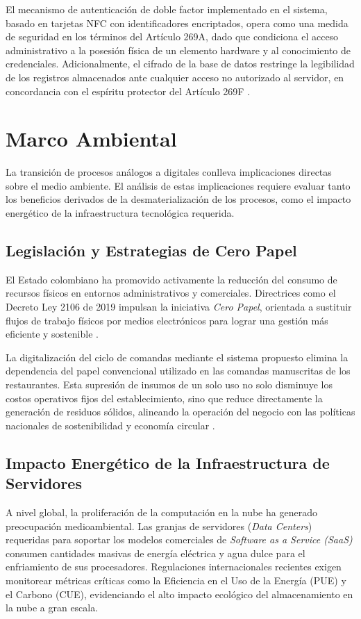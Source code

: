 El mecanismo de autenticación de doble factor implementado en el sistema,
basado en tarjetas NFC con identificadores encriptados, opera como una
medida de seguridad en los términos del Artículo 269A, dado que condiciona
el acceso administrativo a la posesión física de un elemento hardware y al
conocimiento de credenciales. Adicionalmente, el cifrado de la base de datos
restringe la legibilidad de los registros almacenados ante cualquier acceso
no autorizado al servidor, en concordancia con el espíritu protector del
Artículo 269F \cite{ley1273}.


\section{Marco Ambiental}
La transición de procesos análogos a digitales conlleva implicaciones directas sobre el medio ambiente. El análisis de estas implicaciones requiere evaluar tanto los beneficios derivados de la desmaterialización de los procesos, como el impacto energético de la infraestructura tecnológica requerida.

\subsection{Legislación y Estrategias de Cero Papel}
El Estado colombiano ha promovido activamente la reducción del consumo de recursos físicos en entornos administrativos y comerciales. Directrices como el Decreto Ley 2106 de 2019 impulsan la iniciativa \textit{Cero Papel}, orientada a sustituir flujos de trabajo físicos por medios electrónicos para lograr una gestión más eficiente y sostenible \cite{dec2106}. 

La digitalización del ciclo de comandas mediante el sistema propuesto elimina la dependencia del papel convencional utilizado en las comandas manuscritas de los restaurantes. Esta supresión de insumos de un solo uso no solo disminuye los costos operativos fijos del establecimiento, sino que reduce directamente la generación de residuos sólidos, alineando la operación del negocio con las políticas nacionales de sostenibilidad y economía circular \cite{UNSDS}.

\subsection{Impacto Energético de la Infraestructura de Servidores}
A nivel global, la proliferación de la computación en la nube ha generado preocupación medioambiental. Las granjas de servidores (\textit{Data Centers}) requeridas para soportar los modelos comerciales de \textit{Software as a Service (SaaS)} consumen cantidades masivas de energía eléctrica y agua dulce para el enfriamiento de sus procesadores. Regulaciones internacionales recientes exigen monitorear métricas críticas como la Eficiencia en el Uso de la Energía (PUE) y el Carbono (CUE), evidenciando el alto impacto ecológico del almacenamiento en la nube a gran escala.

